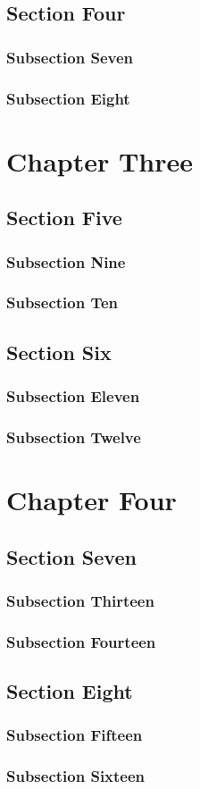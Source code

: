 \documentclass{SGH_thesis}
\begin{document}
\section{Section Four}
\lipsum[45-48]
\subsection{Subsection Seven}
\lipsum[49-52]
\subsection{Subsection Eight}
\lipsum[53-56]

\chapter{Chapter Three}
\lipsum[1-2]
\section{Section Five}
\lipsum[3-4]
\subsection{Subsection Nine}
\lipsum[5-6]
\subsection{Subsection Ten}
\lipsum[7-8]
\section{Section Six}
\lipsum[9-10]
\subsection{Subsection Eleven}
\lipsum[11-12]
\subsection{Subsection Twelve}
\lipsum[13-14]

\chapter{Chapter Four}
\lipsum[15-16]
\section{Section Seven}
\lipsum[17-18]
\subsection{Subsection Thirteen}
\lipsum[19-20]
\subsection{Subsection Fourteen}
\lipsum[21-22]
\section{Section Eight}
\lipsum[23-24]
\subsection{Subsection Fifteen}
\lipsum[25-26]
\subsection{Subsection Sixteen}
\lipsum[27-28]
\end{document}
